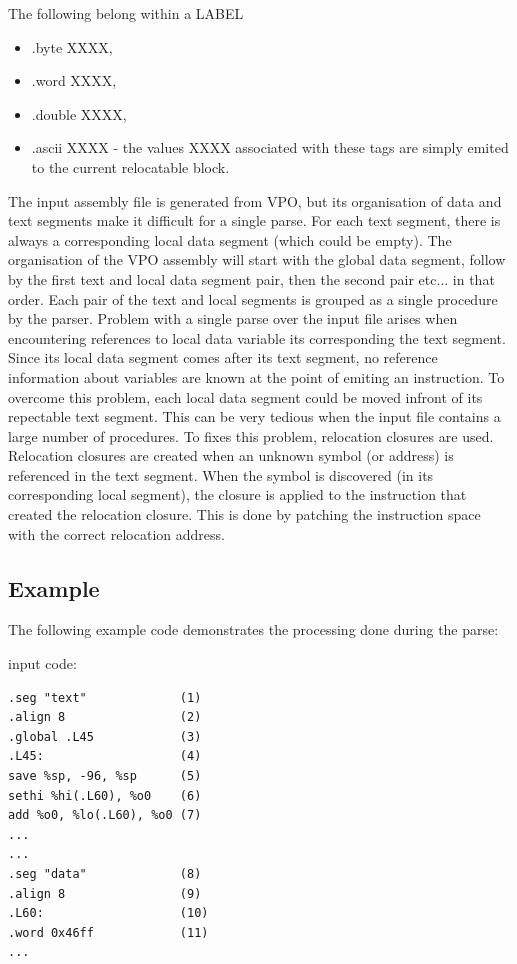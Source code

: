 \begin{itemize}
The following belong within a LABEL 

\begin{itemize} 
\item .byte XXXX, 
\item .word XXXX, 
\item .double XXXX,
\item .ascii XXXX - the values XXXX associated with these tags are simply emited
to the current relocatable block. 
\end{itemize}

\end{itemize}

The input assembly file is generated from VPO, but its organisation
of data and text segments make it difficult for a single parse.  
For each text segment, there is always a corresponding local data segment 
(which could be empty).  
The organisation of the VPO assembly will start with the
global data segment, follow by the first text and local data segment pair,
then the second pair etc...  in that order.  Each pair of the text and
local segments is grouped as a single procedure by the parser.  Problem
with a single parse over the input file arises when encountering
references to local data variable its corresponding the text segment. 
Since its local data segment comes after its text segment, no reference
information about variables are known at the point of emiting an
instruction.  To overcome this problem, each local data segment could be
moved infront of its repectable text segment.  This can be very tedious
when the input file contains a large number of procedures.  To fixes this
problem, relocation closures are used.  Relocation closures are created
when an unknown symbol (or address) is referenced in the text segment. 
When the symbol is discovered (in its corresponding local segment), the
closure is applied to the instruction that created the relocation closure. 
This is done by patching the instruction space with the correct relocation
address. 

\subsection *{Example}

The following example code demonstrates the processing done during the
parse: 

input code:  
\begin{verbatim}
.seg "text"             (1)  
.align 8                (2)  
.global .L45            (3)  
.L45:                   (4) 
save %sp, -96, %sp      (5)  
sethi %hi(.L60), %o0    (6)  
add %o0, %lo(.L60), %o0 (7) 
...  
...  
.seg "data"             (8)  
.align 8                (9)  
.L60:                   (10)  
.word 0x46ff            (11)  
... 
\end{verbatim}

